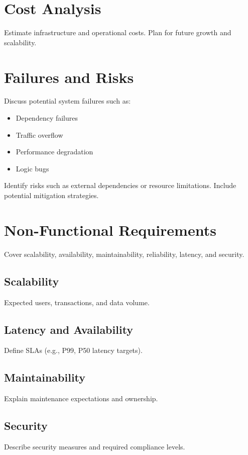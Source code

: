 \documentclass[12pt,a4paper]{article}
\begin{document}
\newpage
\section{Cost Analysis}
Estimate infrastructure and operational costs.  
Plan for future growth and scalability.

\newpage
\section{Failures and Risks}
Discuss potential system failures such as:
\begin{itemize}
  \item Dependency failures
  \item Traffic overflow
  \item Performance degradation
  \item Logic bugs
\end{itemize}

Identify risks such as external dependencies or resource limitations.  
Include potential mitigation strategies.

\newpage
\section{Non-Functional Requirements}
Cover scalability, availability, maintainability, reliability, latency, and security.

\subsection{Scalability}
Expected users, transactions, and data volume.

\subsection{Latency and Availability}
Define SLAs (e.g., P99, P50 latency targets).

\subsection{Maintainability}
Explain maintenance expectations and ownership.

\subsection{Security}
Describe security measures and required compliance levels.
\end{document}
